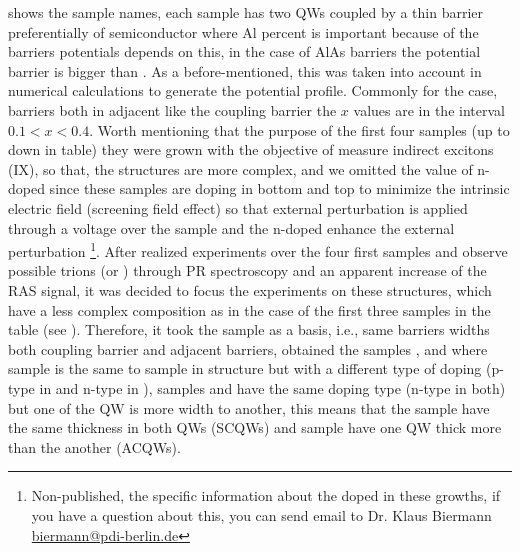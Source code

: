  shows the sample names, each sample has two QWs coupled by a thin barrier preferentially of \algaas semiconductor where Al percent is important because of the barriers potentials depends on this, in the case of AlAs barriers the potential barrier is bigger than \algaas. As a before-mentioned, this was taken into account in numerical calculations to generate the potential profile. Commonly for the case, \algaas barriers both in adjacent like the coupling barrier the $x$ values are in the interval $0.1<x<0.4$. Worth mentioning that the purpose of the first four samples (up to down in table) they were grown with the objective of measure indirect excitons (IX), so that,  the structures are more complex, and we omitted the value of n-doped since these samples are doping in bottom and top to minimize the intrinsic electric field (screening field effect) so that external perturbation is applied through a voltage over the sample\cite{yuan2018tunneling} and the n-doped enhance the external perturbation \footnote{Non-published, the specific information about the doped  in these growths, if you have a question about this, you can send email to Dr. Klaus Biermann \url{biermann@pdi-berlin.de}}. After realized experiments over the four first samples and observe possible trions  (\xp or \xm)  through PR spectroscopy and an apparent increase of the RAS signal, it was decided to focus the experiments on these structures, which have a less complex composition as in the case of the first three samples in the table (see ). Therefore,  it took the sample \tucu as a  basis, i.e., same barriers widths both coupling barrier and adjacent barriers, obtained the samples \tcvu, \tcvd and \tcvt where sample \tcvd is the same to sample \tcvu in structure but with a different type of doping (p-type in \tcvd and n-type in \tcvu), samples \tcvu and \tcvd have the same doping type (n-type in both) but one of the QW is more width to another, this means that the sample \tcvt have the same thickness in both QWs (SCQWs) and sample \tcvu have one  QW  thick more than the another (ACQWs). 


